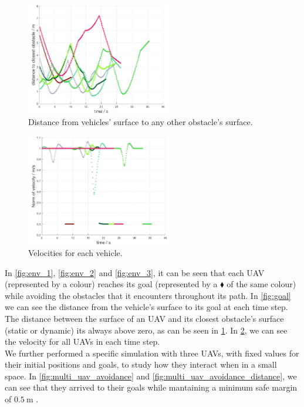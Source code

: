\documentclass[journal, twoside]{IEEEtran}
\begin{document}
		\begin{figure}[h]
			\centering
			\includegraphics[width=2.5in]{Results/Potentialfields/obst}
			\caption{Distance from vehicles' surface to any other obstacle's surface.}
			\label{fig:obst}
		\end{figure}
	
		\begin{figure}[h]
			\centering
			\includegraphics[width=2.5in]{Results/Potentialfields/vel}
			\caption{Velocities for each vehicle.}
			\label{fig:vel}
		\end{figure}

			
		In \figurename{ \ref{fig:env_1}}, \figurename{ \ref{fig:env_2}} and \figurename{ \ref{fig:env_3}}, it can be seen that each UAV (represented by a colour) reaches its goal (represented by a $\blacklozenge$ of the same colour) while avoiding the obstacles that it encounters throughout its path. In \figurename{ \ref{fig:goal}} we can see the distance from the vehicle's surface to its goal at each time step. The distance between the surface of an UAV and its closest obstacle's surface (static or dynamic) its always above zero, as can be seen in \figurename{ \ref{fig:obst}}. In \figurename{ \ref{fig:vel}}, we can see the velocity for all UAVs in each time step.\\
		
		We further performed a specific simulation with three UAVs, with fixed values for their initial positions and goals, to study how they interact when in a small space. In \figurename{ \ref{fig:multi_uav_avoidance}} and \figurename{ \ref{fig:multi_uav_avoidance_distance}}, we can see that they arrived to their goals while mantaining a minimum safe margin of $\SI{0.5}{\meter}$ .\\
		
\end{document}
